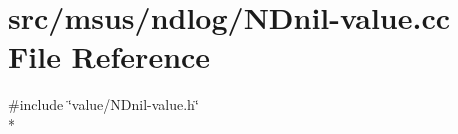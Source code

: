 \hypertarget{_n_dnil-value_8cc}{\section{src/msus/ndlog/\-N\-Dnil-\/value.cc File Reference}
\label{_n_dnil-value_8cc}
}
{\ttfamily \#include \char`\"{}value/\-N\-Dnil-\/value.\-h\char`\"{}}\\*
